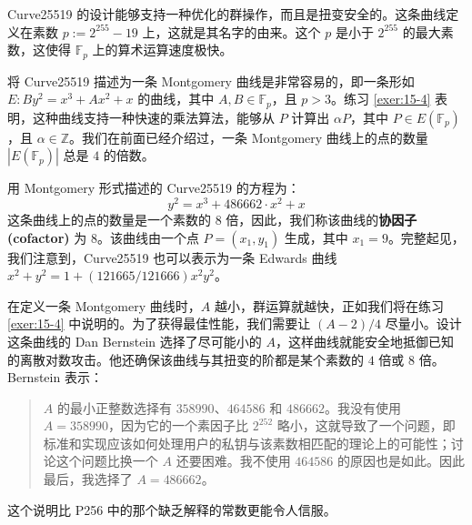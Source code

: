 \begin{snote}[Curve25519。]
Curve25519 的设计能够支持一种优化的群操作，而且是扭变安全的。这条曲线定义在素数 $p:=2^{255}-19$ 上，这就是其名字的由来。这个 $p$ 是小于 $2^{255}$ 的最大素数，这使得 $\mathbb{F}_p$ 上的算术运算速度极快。

将 Curve25519 描述为一条 Montgomery 曲线是非常容易的，即一条形如 $E:By^2=x^3+Ax^2+x$ 的曲线，其中 $A,B\in\mathbb{F}_p$，且 $p>3$。练习 \ref{exer:15-4} 表明，这种曲线支持一种快速的乘法算法，能够从 $P$ 计算出 $\alpha P$，其中 $P\in E(\mathbb{F}_{p})$，且 $\alpha\in\mathbb{Z}$。我们在前面已经介绍过，一条 Montgomery 曲线上的点的数量 $|E(\mathbb{F}_{p})|$ 总是 $4$ 的倍数。

用 Montgomery 形式描述的 Curve25519 的方程为：
\[
y^2=x^3+486662\cdot x^2+x
\]
这条曲线上的点的数量是一个素数的 $8$ 倍，因此，我们称该曲线的\textbf{协因子 (cofactor)} 为 $8$。该曲线由一个点 $P=(x_1,y_1)$ 生成，其中 $x_1=9$。完整起见，我们注意到，Curve25519 也可以表示为一条 Edwards 曲线 $x^2+y^2=1+(121665/121666)x^2y^2$。
\end{snote}

\begin{snote}[为什么常数是 486662？]
在定义一条 Montgomery 曲线时，$A$ 越小，群运算就越快，正如我们将在练习 \ref{exer:15-4} 中说明的。为了获得最佳性能，我们需要让 ${(A-2)}/{4}$ 尽量小。设计这条曲线的 Dan Bernstein 选择了尽可能小的 $A$，这样曲线就能安全地抵御已知的离散对数攻击。他还确保该曲线与其扭变的阶都是某个素数的 $4$ 倍或 $8$ 倍。Bernstein 表示：
\begin{quote}
$A$ 的最小正整数选择有 $358990$、$464586$ 和 $486662$。我没有使用 $A=358990$，因为它的一个素因子比 $2^{252}$ 略小，这就导致了一个问题，即标准和实现应该如何处理用户的私钥与该素数相匹配的理论上的可能性；讨论这个问题比换一个 $A$ 还要困难。我不使用 $464586$ 的原因也是如此。因此最后，我选择了 $A=486662$。
\end{quote}
这个说明比 P256 中的那个缺乏解释的常数更能令人信服。
\end{snote}